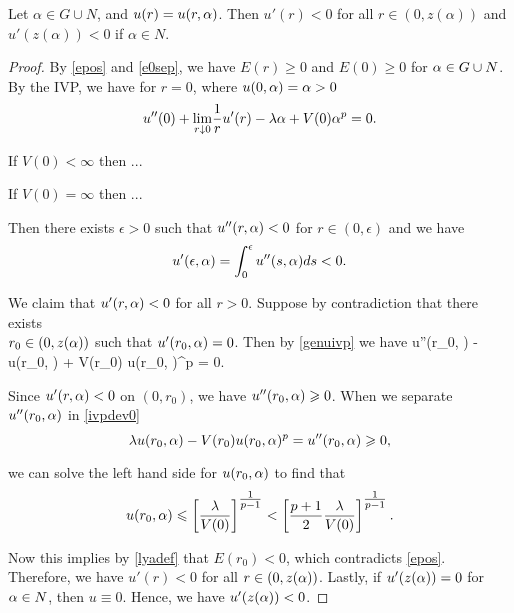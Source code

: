 \begin{lemma}\label{genlem2}
Let $\alpha \in G \cup N$, and $u(r) = u(r, \alpha)$. Then $u'(r) < 0$ for all
$r \in (0, z(\alpha))$ and $u'(z(\alpha)) < 0$ if $\alpha \in N$.
\end{lemma}
\begin{proof}
{\red By \eqref{epos} and \eqref{e0sep}, we have $E(r) \geq 0$ and $E(0) \geq 
0$ for $\alpha \in G \cup N$.} By the IVP, we have for $r=0$, where $u(0, \alpha) = \alpha >
0$
\[ u''(0) + \underset{r \downarrow 0}{\lim} \frac{1}{r} u'(r) -
\lambda \alpha + V(0) \alpha^p = 0. \]

{\red If $V(0) < \infty$ then ...

If $V(0) = \infty$ then ...}

Then there exists $\epsilon > 0$ such that $u''(r, \alpha) < 0$ for $r \in (0,
\epsilon)$ and we have
\[ u'(\epsilon, \alpha) = \int_0^\epsilon u''(s, \alpha) ds < 0. \]

We claim that $u'(r, \alpha) < 0$ for all $r > 0$. Suppose by contradiction that
there exists\\ $r_0 \in (0,z(\alpha))$ such that $u'(r_0, \alpha)=0$. Then by
\eqref{genuivp} we have 
\be \label{ivpdev0} 
u''(r_0, \a) - \lambda u(r_0, \a) + V(r_0) u(r_0, \a)^p = 0. 
\ee

Since $u'(r, \alpha) < 0$ on $(0, r_0)$, we have $u''(r_0, \alpha) \geqslant 0$. 
When we separate $u''(r_0, \alpha)$ in \eqref{ivpdev0} 
\[ \lambda u(r_0,\alpha) - V(r_0) u(r_0,\alpha)^p = u''(r_0, \alpha) \geqslant 0, \]

we can solve the left hand side for $u(r_0, \alpha)$ to find that
\[ u(r_0, \alpha) \leqslant \left[ \frac{\lambda}{V(0)} \right]^{\tfrac{1}{p-1}} <
\left[ \frac{p+1}{2} \frac{\lambda}{V(0)} \right]^{\tfrac{1}{p-1}}. \]

Now this implies by \eqref{lyadef} 
that $E(r_0) <
0$, which contradicts \eqref{epos}. Therefore, we have $u'(r) < 0$ for all $r
\in (0, z(\alpha))$. 
Lastly, if $u'(z(\alpha)) = 0$ for $\alpha \in N$, then $u \equiv 0$. 
Hence, we have $u'(z(\alpha)) < 0$.
\end{proof}

